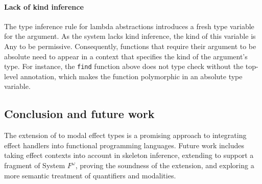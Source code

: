 \documentclass[sigplan, nonacm, natbib = false, review, screen]{acmart}
\newcommand{\Frost}{\text{Frost}\xspace}
\newcommand{\todobox}[3]{{\todo[color=#1!20,bordercolor=#1!80]{%
  \begin{spacing}{0.9}\footnotesize\textbf{#2:} #3\end{spacing}}}}
\newcommand{\sam}[1]{\todobox{yellow}{Sam}{#1}}
\begin{document}
\paragraph{Lack of kind inference}
The type inference rule for lambda abstractions introduces a fresh type variable
for the argument. As the system lacks kind inference, the kind of this variable
is \textsf{Any} to be permissive. Consequently, functions that require their
argument to be absolute need to appear in a context that specifies the kind of the
argument's type. For instance, the \lstinline[style=metl]{find} function above
does not type check without the top-level annotation, which makes the function
polymorphic in an absolute type variable.


\subsection{Conclusion and future work}
The extension of \Frost to modal effect types is a promising approach to
integrating effect handlers into functional programming languages.
%
Future work includes taking effect contexts into account in skeleton inference,
extending \Frost to support a fragment of System $F^\omega$, proving the
soundness of the \Frost extension, and exploring a more semantic treatment of
quantifiers and modalities.

\printbibliography
\end{document}
